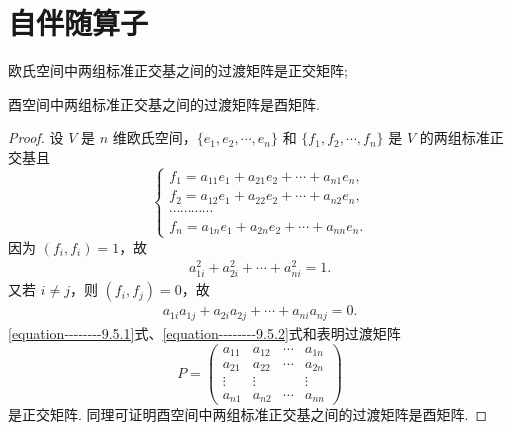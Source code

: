 \documentclass[../../main.tex]{subfiles}%
\begin{document}
\section{自伴随算子}

\begin{lemma}\label{lemma:正交基之间的过渡矩阵是正交(酉)矩阵}
欧氏空间中两组标准正交基之间的过渡矩阵是正交矩阵;

酉空间中两组标准正交基之间的过渡矩阵是酉矩阵.
\end{lemma}
\begin{proof}
设 $V$ 是 $n$ 维欧氏空间，$\{e_1,e_2,\cdots,e_n\}$ 和 $\{f_1,f_2,\cdots,f_n\}$ 是 $V$ 的两组标准正交基且
\[
\begin{cases}
f_1 = a_{11}e_1 + a_{21}e_2 + \cdots + a_{n1}e_n, \\
f_2 = a_{12}e_1 + a_{22}e_2 + \cdots + a_{n2}e_n, \\
\cdots\cdots\cdots\cdots \\
f_n = a_{1n}e_1 + a_{2n}e_2 + \cdots + a_{nn}e_n.
\end{cases}
\]
因为 $(f_i,f_i) = 1$，故
\begin{align}
a_{1i}^2 + a_{2i}^2 + \cdots + a_{ni}^2 = 1.\label{equation--------9.5.1}
\end{align}
又若 $i \neq j$，则 $(f_i,f_j) = 0$，故
\begin{align}
a_{1i}a_{1j} + a_{2i}a_{2j} + \cdots + a_{ni}a_{nj} = 0.\label{equation--------9.5.2}
\end{align}
\eqref{equation--------9.5.1}式、\eqref{equation--------9.5.2}式和表明过渡矩阵
\[
P = \begin{pmatrix}
a_{11} & a_{12} & \cdots & a_{1n} \\
a_{21} & a_{22} & \cdots & a_{2n} \\
\vdots & \vdots & & \vdots \\
a_{n1} & a_{n2} & \cdots & a_{nn}
\end{pmatrix}
\]
是正交矩阵. 同理可证明酉空间中两组标准正交基之间的过渡矩阵是酉矩阵.
\end{proof}
\end{document}
